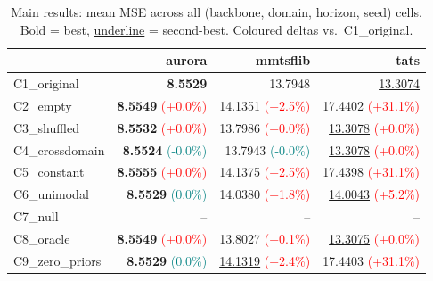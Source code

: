 \begin{table}[t]
\caption{Main results: mean MSE across all (backbone, domain, horizon, seed) cells. Bold = best, \underline{underline} = second-best. Coloured deltas vs.\ C1\_original.}
\label{tab:main_mse}
\centering
\small
\begin{tabular}{lrrr}
\toprule
 & aurora & mmtsflib & tats \\
\midrule
C1\_original & \textbf{8.5529} & 13.7948 & \underline{13.3074} \\
C2\_empty & \textbf{8.5549} {\tiny \textcolor{red}{(+0.0\%)}} & \underline{14.1351} {\tiny \textcolor{red}{(+2.5\%)}} & 17.4402 {\tiny \textcolor{red}{(+31.1\%)}} \\
C3\_shuffled & \textbf{8.5532} {\tiny \textcolor{red}{(+0.0\%)}} & 13.7986 {\tiny \textcolor{red}{(+0.0\%)}} & \underline{13.3078} {\tiny \textcolor{red}{(+0.0\%)}} \\
C4\_crossdomain & \textbf{8.5524} {\tiny \textcolor{teal}{(-0.0\%)}} & 13.7943 {\tiny \textcolor{teal}{(-0.0\%)}} & \underline{13.3078} {\tiny \textcolor{red}{(+0.0\%)}} \\
C5\_constant & \textbf{8.5555} {\tiny \textcolor{red}{(+0.0\%)}} & \underline{14.1375} {\tiny \textcolor{red}{(+2.5\%)}} & 17.4398 {\tiny \textcolor{red}{(+31.1\%)}} \\
C6\_unimodal & \textbf{8.5529} {\tiny \textcolor{teal}{(0.0\%)}} & 14.0380 {\tiny \textcolor{red}{(+1.8\%)}} & \underline{14.0043} {\tiny \textcolor{red}{(+5.2\%)}} \\
C7\_null & -- & -- & -- \\
C8\_oracle & \textbf{8.5549} {\tiny \textcolor{red}{(+0.0\%)}} & 13.8027 {\tiny \textcolor{red}{(+0.1\%)}} & \underline{13.3075} {\tiny \textcolor{red}{(+0.0\%)}} \\
C9\_zero\_priors & \textbf{8.5529} {\tiny \textcolor{teal}{(0.0\%)}} & \underline{14.1319} {\tiny \textcolor{red}{(+2.4\%)}} & 17.4403 {\tiny \textcolor{red}{(+31.1\%)}} \\
\bottomrule
\end{tabular}
\end{table}
